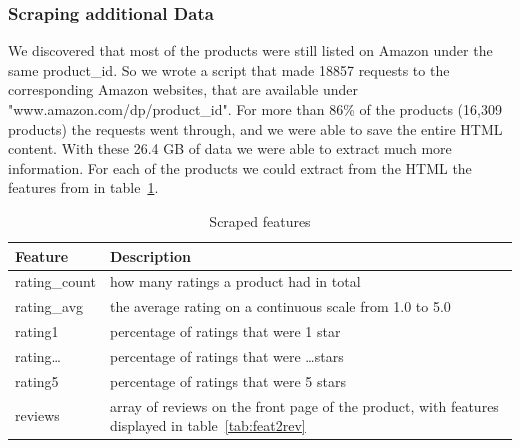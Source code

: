 \documentclass{article}
\begin{document}
\subsubsection{Scraping additional Data}

We discovered that most of the products were still listed on Amazon under the same product\_id. So we wrote a script that made 18857 requests to the corresponding Amazon websites, that are available under "www.amazon.com/dp/product\_id". For more than 86\% of the products (16,309 products) the requests went through, and we were able to save the entire HTML content. With these 26.4 GB of data we were able to extract much more information. For each of the products we could extract from the HTML the features from in table~\ref{tab:feat2}.

\begin{table}[ht]
  \centering
  \caption{Scraped features}
  \label{tab:feat2}
  \begin{tabular}{l p{6cm}}
    Feature       & Description                                                                                            \\
    \hline
    rating\_count & how many ratings a product had in total                                                                \\
    rating\_avg   & the average rating on a continuous scale from 1.0 to 5.0                                               \\
    rating1       & percentage of ratings that were 1 star                                                                 \\
    rating\dots   & percentage of ratings that were \dots stars                                                            \\
    rating5       & percentage of ratings that were 5 stars                                                                \\
    reviews       & array of reviews on the front page of the product, with features displayed in table~\ref{tab:feat2rev}
  \end{tabular}
\end{table}
\end{document}
